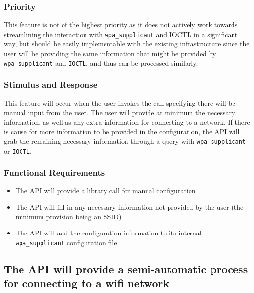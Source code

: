 \subsubsection{Priority}
This feature is not of the highest priority as it does not actively work towards streamlining
the interaction with \texttt{wpa\_supplicant} and IOCTL in a significant way, but should be easily 
implementable with the existing infrastructure since the user will be providing the same
information that might be provided by \texttt{wpa\_supplicant} and \texttt{IOCTL}, and thus can be processed
similarly.

\subsubsection{Stimulus and Response}
This feature will occur when the user invokes the call specifying there will be
manual input from the user. The user will provide at minimum the necessary information,
as well as any extra information for connecting to a network. If there is cause for more
information to be provided in the configuration, the API will grab the remaining necessary
information through a query with \texttt{wpa\_supplicant} or \texttt{IOCTL}.

\subsubsection{Functional Requirements}

\begin{itemize}
  \item The API will provide a library call for manual configuration
  \item The API will fill in any necessary information not provided by the user
    (the minimum provision being an SSID)
  \item The API will add the configuration information to its internal \texttt{wpa\_supplicant}
    configuration file
\end{itemize}


\subsection{The API will provide a semi-automatic process for connecting to a wifi network}
